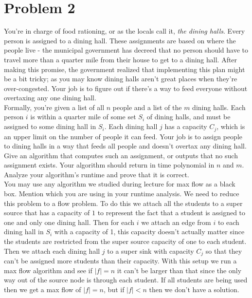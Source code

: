 \documentclass{article}
\begin{document}
\newpage
\section*{Problem 2}
You're in charge of food rationing, or as the locals call it, \emph{the dining halls}.
Every person is assigned to a dining hall.
These assignments are based on where the people live - the municipal government has decreed that no person should have to travel more than a quarter mile from their house to get to a dining hall.
After making this promise, the government realized that implementing this plan might be a bit tricky; as you may know dining halls aren't great places when they're over-congested.
Your job is to figure out if there's a way to feed everyone without overtaxing any one dining hall.
\\
\indent Formally, you're given a list of all $n$ people and a list of the $m$ dining halls.
Each person $i$ is within a quarter mile of some set $S_i$ of dining halls, and must be assigned to some dining hall in $S_i$.
Each dining hall $j$ has a capacity $C_j$, which is an upper limit on the number of people it can feed.
Your job is to assign people to dining halls in a way that feeds all people and doesn't overtax any dining hall.
Give an algorithm that computes such an assignment, or outputs that no such assignment exists.
Your algorithm should return in time polynomial in $n$ and $m$. Analyze your algorithm's runtime and prove that it is correct.
\\
\indent You may use any algorithm we studied during lecture for max flow as a black box.
Mention which you are using in your runtime analysis.
\newline
\newline
\indent We need to reduce this problem to a flow problem.
To do this we attach all the students to a super source that has a capacity of $1$ to represent the fact that a student is assigned to one and only one dining hall.
Then for each $i$ we attach an edge from $i$ to each dining hall in $S_i$ with a capacity of 1, this capacity doesn't actually matter since the students are restricted from the super source capacity of one to each student.
Then we attach each dining hall $j$ to a super sink with capacity $C_j$ so that they can't be assigned more students than their capacity.
With this setup we run a max flow algorithm and see if $|f| = n$ it can't be larger than that since the only way out of the source node is through each student.
If all students are being used then we get a max flow of $|f| = n$, but if $|f| < n$ then we don't have a solution.
\end{document}
